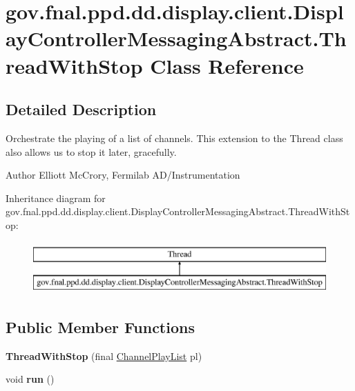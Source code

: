 \hypertarget{classgov_1_1fnal_1_1ppd_1_1dd_1_1display_1_1client_1_1DisplayControllerMessagingAbstract_1_1ThreadWithStop}{\section{gov.\-fnal.\-ppd.\-dd.\-display.\-client.\-Display\-Controller\-Messaging\-Abstract.\-Thread\-With\-Stop Class Reference}
\label{classgov_1_1fnal_1_1ppd_1_1dd_1_1display_1_1client_1_1DisplayControllerMessagingAbstract_1_1ThreadWithStop}
}


\subsection{Detailed Description}
Orchestrate the playing of a list of channels. This extension to the Thread class also allows us to stop it later, gracefully.

\begin{DoxyAuthor}{Author}
Elliott Mc\-Crory, Fermilab A\-D/\-Instrumentation 
\end{DoxyAuthor}
Inheritance diagram for gov.\-fnal.\-ppd.\-dd.\-display.\-client.\-Display\-Controller\-Messaging\-Abstract.\-Thread\-With\-Stop\-:\begin{figure}[H]
\begin{center}
\leavevmode
\includegraphics[height=2.000000cm]{classgov_1_1fnal_1_1ppd_1_1dd_1_1display_1_1client_1_1DisplayControllerMessagingAbstract_1_1ThreadWithStop}
\end{center}
\end{figure}
\subsection*{Public Member Functions}
\begin{DoxyCompactItemize}
\item 
\hypertarget{classgov_1_1fnal_1_1ppd_1_1dd_1_1display_1_1client_1_1DisplayControllerMessagingAbstract_1_1ThreadWithStop_aebe2e9dec1d69ac75d74ebcc867ed921}{{\bfseries Thread\-With\-Stop} (final \hyperlink{classgov_1_1fnal_1_1ppd_1_1dd_1_1channel_1_1ChannelPlayList}{Channel\-Play\-List} pl)}\label{classgov_1_1fnal_1_1ppd_1_1dd_1_1display_1_1client_1_1DisplayControllerMessagingAbstract_1_1ThreadWithStop_aebe2e9dec1d69ac75d74ebcc867ed921}

\item 
\hypertarget{classgov_1_1fnal_1_1ppd_1_1dd_1_1display_1_1client_1_1DisplayControllerMessagingAbstract_1_1ThreadWithStop_a3a8072938a59f88b0b1a62775ef1809b}{void {\bfseries run} ()}\label{classgov_1_1fnal_1_1ppd_1_1dd_1_1display_1_1client_1_1DisplayControllerMessagingAbstract_1_1ThreadWithStop_a3a8072938a59f88b0b1a62775ef1809b}

\end{DoxyCompactItemize}
